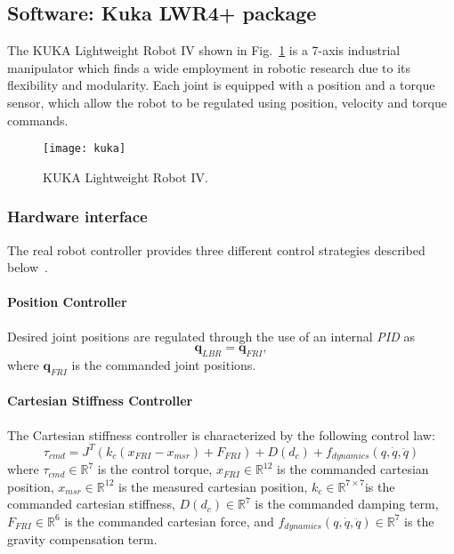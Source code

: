 \subsection{Software: Kuka LWR4+ package}
\label{sec:kuka}

The KUKA Lightweight Robot IV shown in Fig.~\ref{fig:kuka_arm} is a 7-axis industrial manipulator which finds a wide employment in robotic research due to its flexibility and modularity.
Each joint is equipped with a position and a torque sensor, which allow the robot to be regulated using position, velocity and torque commands.
\begin{figure}
\centering
\texttt{[image: kuka]}
\caption{KUKA Lightweight Robot IV.}
\label{fig:kuka_arm}
\end{figure}

\subsubsection{Hardware interface}
The real robot controller provides three different control strategies described below~\cite{kukafri}.

\paragraph{Position Controller}
Desired joint positions are regulated through the use of an internal \textit{PID} as
\begin{equation}
\mathbf{q}_{LBR} = \mathbf{q}_{FRI},
\label{eq:positioncontroller}
\end{equation}
where $\mathbf{q}_{FRI}$ is the commanded joint positions.

\paragraph{Cartesian Stiffness Controller}
The Cartesian stiffness controller is characterized by the following control law:
\begin{equation}
\tau_{cmd} = J^T(k_c(x_{FRI} - x_{msr}) + F_{FRI}) + D(d_c) + f_{dynamics}(q,\dot{q},\ddot{q})
\label{eq:cartesianstiffnesscontroller}
\end{equation}
where $\tau_{cmd}\in\mathbb{R}^7$ is the  control torque, $x_{FRI}\in\mathbb{R}^{12}$ is the commanded cartesian position, $x_{msr}\in\mathbb{R}^{12}$ is the measured cartesian position, $k_c\in\mathbb{R}^{7\times 7}$is the commanded cartesian stiffness, $D(d_c)\in\mathbb{R}^7$ is the commanded damping term, $F_{FRI}\in\mathbb{R}^6$ is the commanded cartesian force, and $f_{dynamics}(q,\dot{q},\ddot{q})\in\mathbb{R}^7$ is the gravity compensation term.

